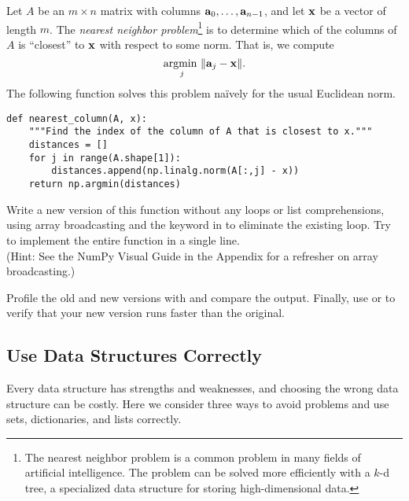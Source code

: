 \begin{problem} %
Let $A$ be an $m\times n$ matrix with columns $\mathbf{a}_0, \ldots, \mathbf{a}_{n-1}$, and let $\mathbf{x}$ be a vector of length $m$.
The \emph{nearest neighbor problem}\footnote{The nearest neighbor problem is a common problem in many fields of artificial intelligence. The problem can be solved more efficiently with a $k$-d tree, a specialized data structure for storing high-dimensional data.} is to determine which of the columns of $A$ is ``closest'' to $\mathbf{x}$ with respect to some norm.
That is, we compute
\[\underset{j}{\text{argmin }} \|\mathbf{a}_j - \mathbf{x}\|.\]
The following function solves this problem na\"ively for the usual Euclidean norm.
\begin{lstlisting}
def nearest_column(A, x):
    """Find the index of the column of A that is closest to x."""
    distances = []
    for j in range(A.shape[1]):
        distances.append(np.linalg.norm(A[:,j] - x))
    return np.argmin(distances)
\end{lstlisting}

Write a new version of this function without any loops or list comprehensions, using array broadcasting and the  keyword in  to eliminate the existing loop.
Try to implement the entire function in a single line.
\\(Hint: See the NumPy Visual Guide in the Appendix for a refresher on array broadcasting.)

Profile the old and new versions with  and compare the output.
Finally, use  or  to verify that your new version runs faster than the original.
\end{problem}

\subsection*{Use Data Structures Correctly} %


Every data structure has strengths and weaknesses, and choosing the wrong data structure can be costly.
Here we consider three ways to avoid problems and use sets, dictionaries, and lists correctly.

